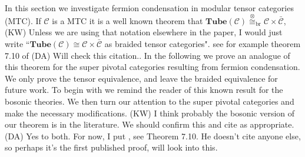 \documentclass[12pt,a4paper]{article}
\newcommand{\tp}{\otimes}
\newcommand{\mcc}{\mathcal{C}}
\newcommand{\tube}{\textbf{Tube}}
\newcommand{\kw}[1]{{\color{kwcolor}\footnotesize{(KW) #1}}}
\newcommand{\dave}[1]{{\color{ao(english)}\footnotesize{(DA) #1}}}
\newcommand{\ethan}[1]{{\color{amethyst}\footnotesize{(EL) #1}}}
\begin{document}
In this section we investigate fermion condensation in modular tensor categories (MTC).
If $\mcc$ is a MTC it is a well known theorem that $\tube(\mcc) \overset{\tp}{\cong}_\text{br} \mcc \times \bar{\mcc}$, 
\kw{Unless we are using that notation elsewhere in the paper, I would just write
``$\tube(\mcc) \cong \mcc \times \bar{\mcc}$ as braided tensor categories".}
see for example theorem 7.10 of \cite{muger2003b} \dave{Will check this citation.}.
In the following we prove an analogue of this theorem for the super pivotal categories resulting from fermion condensation.
We only prove the tensor equivalence, and leave the braided equivalence for future work. 
To begin with we remind the reader of this known result for the bosonic theories.
We then turn our attention to the super pivotal categories and make the necessary modifications.
\kw{I think probably the bosonic version of our theorem is in the literature.
We should confirm this and cite as appropriate.}
\dave{Yes to both.
For now, I put \cite{muger2003b}, see Theorem 7.10.
He doesn't cite anyone else, so perhaps it's the first published proof, will look into this.}
\end{document}
